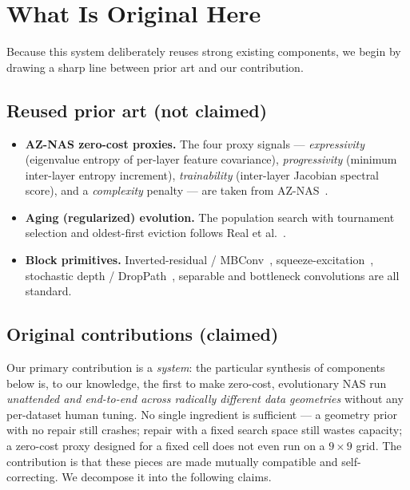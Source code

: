 \documentclass[10pt,twocolumn]{article}
\begin{document}
\section{What Is Original Here}
\label{sec:original}

Because this system deliberately reuses strong existing components, we begin by
drawing a sharp line between prior art and our contribution.

\subsection{Reused prior art (not claimed)}
\begin{itemize}\itemsep2pt
\item \textbf{AZ-NAS zero-cost proxies.} The four proxy signals ---
  \emph{expressivity} (eigenvalue entropy of per-layer feature covariance),
  \emph{progressivity} (minimum inter-layer entropy increment),
  \emph{trainability} (inter-layer Jacobian spectral score), and a
  \emph{complexity} penalty --- are taken from AZ-NAS~\cite{aznas2024}.
\item \textbf{Aging (regularized) evolution.} The population search with
  tournament selection and oldest-first eviction follows
  Real et al.~\cite{regevo2019}.
\item \textbf{Block primitives.} Inverted-residual / MBConv~\cite{mobilenetv2},
  squeeze-excitation~\cite{senet}, stochastic depth /
  DropPath~\cite{stochasticdepth}, separable and bottleneck convolutions are
  all standard.
\end{itemize}

\subsection{Original contributions (claimed)}
\label{sec:contributions}

Our primary contribution is a \emph{system}: the particular synthesis of
components below is, to our knowledge, the first to make zero-cost,
evolutionary NAS run \emph{unattended and end-to-end across radically different
data geometries} without any per-dataset human tuning. No single ingredient is
sufficient --- a geometry prior with no repair still crashes; repair with a
fixed search space still wastes capacity; a zero-cost proxy designed for a
fixed cell does not even run on a $9{\times}9$ grid. The contribution is that
these pieces are made mutually compatible and self-correcting. We decompose it
into the following claims.
\end{document}
